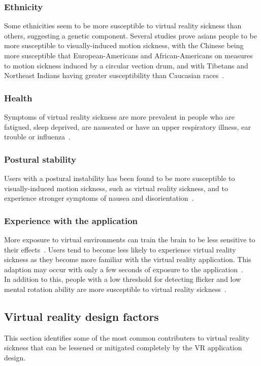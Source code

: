 \subsubsection{Ethnicity}
Some ethnicities seem to be more susceptible to virtual reality sickness than others, suggesting a genetic component. 
Several studies prove asians people to be more susceptible to visually-induced motion sickness,
with the Chinese being more susceptible that European-Americans and African-Americans on measures to motion sickness induced by a circular vection drum, and with
Tibetans and Northeast Indians having greater susceptibility than Caucasian races~\citet{Barrett2004}.

\subsubsection{Health}
Symptoms of virtual reality sickness are more prevalent in people who are fatigued, sleep deprived, are nauseated or have an upper respiratory illness, ear trouble or influenza~\cite{Kolasinski1995}.

\subsubsection{Postural stability}
Users with a postural instability has been found to be more susceptible to visually-induced motion sickness, such as virtual reality sickness, and to experience
stronger symptoms of nausea and disorientation~\cite{Kolasinski1995}. 

\subsubsection{Experience with the application}
More exposure to virtual environments can train the brain to be less sensitive to their effects~\citep{Stanney2003}. Users tend to become less likely to experience
virtual reality sickness as they become more familiar with the virtual reality application. This adaption may occur with only a few seconds of exposure to the application~\cite{Kennedy1985}.\\


In addition to this, people with a low threshold for detecting flicker and low mental rotation ability are more susceptible to virtual reality sickness~\cite{Kolasinski1995}.

\subsection{Virtual reality design factors}
This section identifies some of the most common contributers to virtual reality sickness that can be lessened or mitigated completely by the VR application design.

